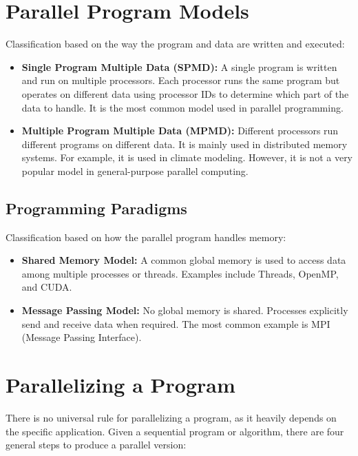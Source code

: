 \documentclass[12pt]{book}
\begin{document}
\section{Parallel Program Models}
Classification based on the way the program and data are written and executed:
\begin{itemize}
    \item \textbf{Single Program Multiple Data (SPMD):} A single program is written and run on multiple processors. Each processor runs the same program but operates on different data using processor IDs to determine which part of the data to handle. It is the most common model used in parallel programming.
    
    \item \textbf{Multiple Program Multiple Data (MPMD):} Different processors run different programs on different data. It is mainly used in distributed memory systems. For example, it is used in climate modeling. However, it is not a very popular model in general-purpose parallel computing.
\end{itemize}

\subsection{Programming Paradigms}
Classification based on how the parallel program handles memory:

\begin{itemize}
    \item \textbf{Shared Memory Model:} A common global memory is used to access data among multiple processes or threads. Examples include Threads, OpenMP, and CUDA.
    
    \item \textbf{Message Passing Model:} No global memory is shared. Processes explicitly send and receive data when required. The most common example is MPI (Message Passing Interface).
\end{itemize}

\section{Parallelizing a Program}

There is no universal rule for parallelizing a program, as it heavily depends on the specific application. Given a sequential program or algorithm, there are four general steps to produce a parallel version:
\end{document}
